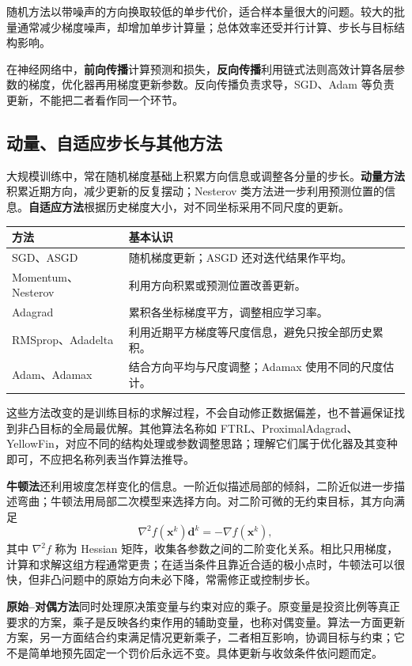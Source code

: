 \documentclass[UTF8,fontset=fandol,a4paper,12pt]{ctexart}
\newcommand{\vx}{\boldsymbol x}
\theoremstyle{definition}
\begin{document}
随机方法以带噪声的方向换取较低的单步代价，适合样本量很大的问题。较大的批量通常减少梯度噪声，却增加单步计算量；总体效率还受并行计算、步长与目标结构影响。

在神经网络中，\textbf{前向传播}计算预测和损失，\textbf{反向传播}利用链式法则高效计算各层参数的梯度，优化器再用梯度更新参数。反向传播负责求导，SGD、Adam 等负责更新，不能把二者看作同一个环节。

\subsection{动量、自适应步长与其他方法}
大规模训练中，常在随机梯度基础上积累方向信息或调整各分量的步长。\textbf{动量方法}积累近期方向，减少更新的反复摆动；Nesterov 类方法进一步利用预测位置的信息。\textbf{自适应方法}根据历史梯度大小，对不同坐标采用不同尺度的更新。
\begin{center}
\begin{tabular}{p{}p{}}
\toprule
方法 & 基本认识\\
\midrule
SGD、ASGD & 随机梯度更新；ASGD 还对迭代结果作平均。\\
Momentum、Nesterov & 利用方向积累或预测位置改善更新。\\
Adagrad & 累积各坐标梯度平方，调整相应学习率。\\
RMSprop、Adadelta & 利用近期平方梯度等尺度信息，避免只按全部历史累积。\\
Adam、Adamax & 结合方向平均与尺度调整；Adamax 使用不同的尺度估计。\\
\bottomrule
\end{tabular}
\end{center}
这些方法改变的是训练目标的求解过程，不会自动修正数据偏差，也不普遍保证找到非凸目标的全局最优解。其他算法名称如 FTRL、ProximalAdagrad、YellowFin，对应不同的结构处理或参数调整思路；理解它们属于优化器及其变种即可，不应把名称列表当作算法推导。

\textbf{牛顿法}还利用坡度怎样变化的信息。一阶近似描述局部的倾斜，二阶近似进一步描述弯曲；牛顿法用局部二次模型来选择方向。对二阶可微的无约束目标，其方向满足
\[
 \nabla^2 f(\vx^k)\boldsymbol d^k=-\nabla f(\vx^k),
\]
其中 $\nabla^2f$ 称为 Hessian 矩阵，收集各参数之间的二阶变化关系。相比只用梯度，计算和求解这组方程通常更贵；在适当条件且靠近合适的极小点时，牛顿法可以很快，但非凸问题中的原始方向未必下降，常需修正或控制步长。

\textbf{原始--对偶方法}同时处理原决策变量与约束对应的乘子。原变量是投资比例等真正要求的方案，乘子是反映各约束作用的辅助变量，也称对偶变量。算法一方面更新方案，另一方面结合约束满足情况更新乘子，二者相互影响，协调目标与约束；它不是简单地预先固定一个罚价后永远不变。具体更新与收敛条件依问题而定。
\end{document}
